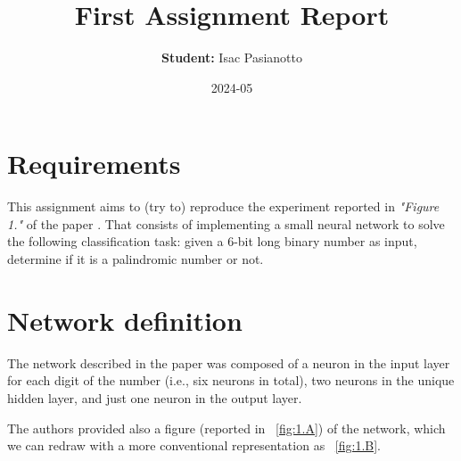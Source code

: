\documentclass{article}
\title{First Assignment Report}
\author{\textbf{Student:} Isac Pasianotto}
\date{2024-05}
\begin{document}
    \maketitle

    \section{Requirements}\label{sec:requirements}
    This assignment aims to (try to) reproduce the experiment reported in \textit{"Figure 1."} of the paper \cite{Rumelhart1986LearningRB}.
    \noindent That consists of implementing a small neural network to solve the following classification task: given a 6-bit long binary number as input, determine if it is a palindromic number or not.

    \section{Network definition}\label{sec:network-definition}

    The network described in the paper was composed of a neuron in the input layer for each digit of the number (i.e., six neurons in total),
    two neurons in the unique hidden layer, and just one neuron  in the output layer.

    \noindent The authors provided also a figure (reported in ~\ref{fig:1.A}) of the network, which we can redraw with a more conventional representation as ~\ref{fig:1.B}.
\end{document}
